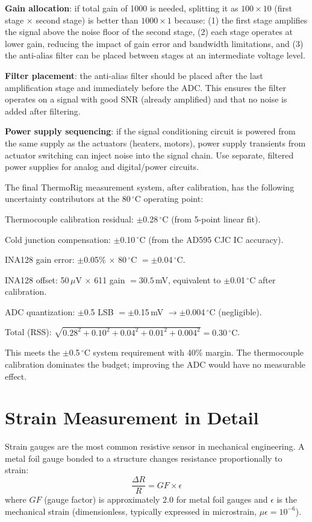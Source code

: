 \documentclass[11pt,letterpaper,twoside,openany]{book}
\newcommand{\degC}{\ensuremath{{}^{\circ}\text{C}}}
\begin{document}
\textbf{Gain allocation}: if total gain of 1000 is needed, splitting it as $100 \times 10$ (first stage $\times$ second stage) is better than $1000 \times 1$ because: (1) the first stage amplifies the signal above the noise floor of the second stage, (2) each stage operates at lower gain, reducing the impact of gain error and bandwidth limitations, and (3) the anti-alias filter can be placed between stages at an intermediate voltage level.

\textbf{Filter placement}: the anti-alias filter should be placed after the last amplification stage and immediately before the ADC. This ensures the filter operates on a signal with good SNR (already amplified) and that no noise is added after filtering.

\textbf{Power supply sequencing}: if the signal conditioning circuit is powered from the same supply as the actuators (heaters, motors), power supply transients from actuator switching can inject noise into the signal chain. Use separate, filtered power supplies for analog and digital/power circuits.

\begin{examplebox}
The final ThermoRig measurement system, after calibration, has the following uncertainty contributors at the 80\,\degC{} operating point:

Thermocouple calibration residual: $\pm$0.28\,\degC{} (from 5-point linear fit).

Cold junction compensation: $\pm$0.10\,\degC{} (from the AD595 CJC IC accuracy).

INA128 gain error: $\pm$0.05\% $\times$ 80\,\degC{} $= \pm$0.04\,\degC{}.

INA128 offset: 50\,$\mu$V $\times$ 611 gain $= 30.5$\,mV, equivalent to $\pm$0.01\,\degC{} after calibration.

ADC quantization: $\pm$0.5 LSB $= \pm$0.15\,mV $\to \pm$0.004\,\degC{} (negligible).

Total (RSS): $\sqrt{0.28^2 + 0.10^2 + 0.04^2 + 0.01^2 + 0.004^2} = 0.30$\,\degC{}.

This meets the $\pm$0.5\,\degC{} system requirement with 40\% margin. The thermocouple calibration dominates the budget; improving the ADC would have no measurable effect.
\end{examplebox}

\section{Strain Measurement in Detail}
Strain gauges are the most common resistive sensor in mechanical engineering. A metal foil gauge bonded to a structure changes resistance proportionally to strain:
\begin{equation}
\frac{\Delta R}{R} = GF \times \epsilon
\end{equation}
where $GF$ (gauge factor) is approximately 2.0 for metal foil gauges and $\epsilon$ is the mechanical strain (dimensionless, typically expressed in microstrain, $\mu\epsilon = 10^{-6}$).
\end{document}
